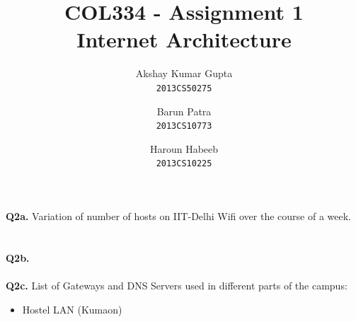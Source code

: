 \documentclass[12pt]{article}
\begin{document}
\title{COL334 - Assignment 1\\ Internet Architecture}
\author{Akshay Kumar Gupta\\\texttt{2013CS50275} \and  Barun Patra\\\texttt{2013CS10773} \and Haroun Habeeb\\\texttt{2013CS10225}}
\date{}
\maketitle
{\bfseries Q2a.} Variation of number of hosts on IIT-Delhi Wifi over the course of a week.\\
~
\\

{}
~
\\
{\bfseries Q2b.} \\ \\
{\bfseries Q2c.} List of Gateways and DNS Servers used in different parts of the campus:
\begin{itemize}
\item Hostel LAN (Kumaon)
\end{itemize}
\end{document}
